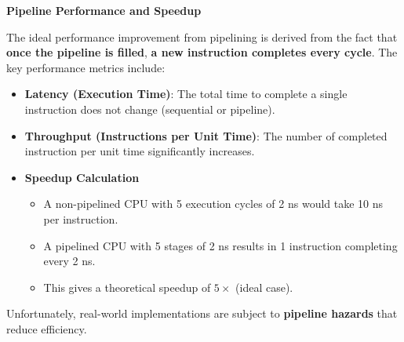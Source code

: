 \newpage

\begin{flushleft}
    \textcolor{Green3}{\faIcon{\speedIcon} \textbf{Pipeline Performance and Speedup}}
\end{flushleft}
The ideal performance improvement from pipelining is derived from the fact that \textbf{once the pipeline is filled}, \textbf{a new instruction completes every cycle}. The key performance metrics include:
\begin{itemize}
    \item \textbf{Latency (Execution Time)}: The total time to complete a single instruction does not change (sequential or pipeline).
    \item \textbf{Throughput (Instructions per Unit Time)}: The number of completed instruction per unit time significantly increases.
    \item \textbf{Speedup Calculation}
    \begin{itemize}
        \item A non-pipelined CPU with 5 execution cycles of 2 ns would take 10 ns per instruction.
        \item A pipelined CPU with 5 stages of 2 ns results in 1 instruction completing every 2 ns.
        \item This gives a theoretical speedup of $5\times$ (ideal case).
    \end{itemize}
\end{itemize}
Unfortunately, real-world implementations are subject to \textbf{pipeline hazards} that reduce efficiency.

\newpage

